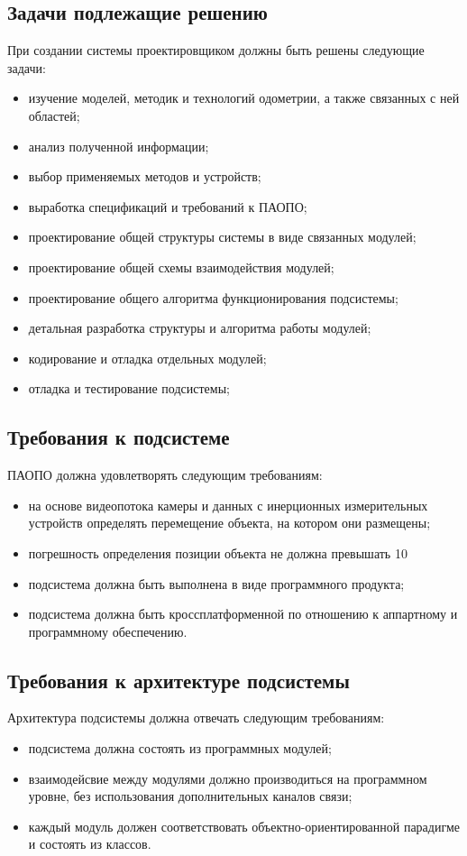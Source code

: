 \documentclass
[a4paper,14pt,russian]{article}
\begin{document}
\subsection{Задачи подлежащие решению}
При создании системы проектировщиком должны быть решены следующие задачи:
\begin{itemize}
\item изучение моделей, методик и технологий одометрии, а также связанных с ней областей;
\item анализ полученной информации;
\item выбор применяемых методов и устройств;
\item выработка спецификаций и требований к ПАОПО;
\item проектирование общей структуры системы в виде связанных модулей;
\item проектирование общей схемы взаимодействия модулей;
\item проектирование общего алгоритма функционирования подсистемы;
\item детальная разработка структуры и алгоритма работы модулей;
\item кодирование и отладка отдельных модулей; 
\item отладка и тестирование подсистемы;
\end{itemize}

\subsection{Требования к подсистеме}
ПАОПО должна удовлетворять следующим требованиям:
\begin{itemize}
\item на основе видеопотока камеры и данных с инерционных измерительных устройств определять перемещение объекта, на котором они размещены;
\item погрешность определения позиции объекта не должна превышать 10%
\item подсистема должна быть выполнена в виде программного продукта;
\item подсистема должна быть кроссплатформенной по отношению к аппартному и программному обеспечению. 
\end{itemize}

\subsection{Требования к архитектуре подсистемы}
Архитектура подсистемы должна отвечать следующим требованиям:
\begin{itemize}
\item подсистема должна состоять из программных модулей; 
\item взаимодейсвие между модулями должно производиться на программном уровне, без использования дополнительных каналов связи;
\item каждый модуль должен соответствовать объектно-ориентированной парадигме и состоять из классов.  
\end{itemize}
\end{document}

